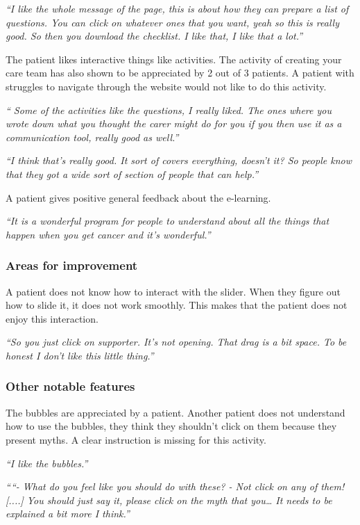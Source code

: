 \documentclass{sigchi}
\begin{document}
\textit{“I like the whole message of the page, this is about how they can prepare a list of questions. You can click on whatever ones that you want, yeah so this is really good. So then you download the checklist. I like that, I like that a lot.”}

The patient likes interactive things like activities. The activity of creating your care team has also shown to be appreciated by 2 out of 3 patients. A patient with struggles to navigate through the website would not like to do this activity.

\textit{“ Some of the activities like the questions, I really liked. The ones where you wrote down what you thought the carer might do for you if you then use it as a communication tool, really good as well.”}

\textit{“I think that’s really good. It sort of covers everything, doesn’t it? So people know that they got a wide sort of section of people that can help.”}

A patient gives positive general feedback about the e-learning.

\textit{“It is a wonderful program for people to understand about all the things that happen when you get cancer and it’s wonderful.”}

\subsubsection{Areas for improvement}
A patient does not know how to interact with the slider. When they figure out how to slide it, it does not work smoothly. This makes that the patient does not enjoy this interaction.

\textit{“So you just click on supporter. It’s not opening. That drag is a bit space. To be honest I don’t like this little thing.”}

\subsubsection{Other notable features}
The bubbles are appreciated by a patient. Another patient does not understand how to use the bubbles, they think they shouldn’t click on them because they present myths. A clear instruction is missing for this activity.

\textit{“I like the bubbles.”}

\textit{““- What do you feel like you should do with these? - Not click on any of them! [....] You should just say it, please click on the myth that you… It needs to be explained a bit more I think.”}
\end{document}
